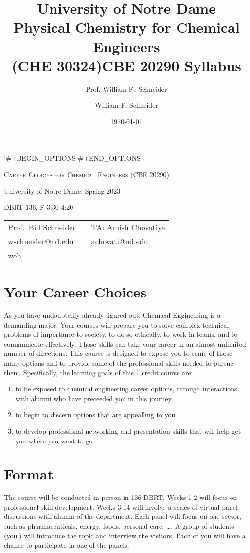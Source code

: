 \documentclass[11pt]{article}
\title{University of Notre Dame\\Physical Chemistry for Chemical Engineers\\(CHE 30324)}
\author{Prof. William F.\ Schneider}
\author{William F. Schneider}
\date{\today}
\title{CBE 20290  Syllabus}
\begin{document}
'\#+BEGIN\_OPTIONS
\#+END\_OPTIONS

\begin{center}
\textsc{Career Choices for Chemical Engineers (CBE 20290)}

University of Notre Dame, Spring 2023

DBRT 136, F 3:30-4:20 
\end{center}

\begin{center}
\begin{tabular}{lll}
\hline
Prof.~\href{https://www.linkedin.com/in/william-schneider-570091a/}{Bill Schneider} &  & TA: \href{https://www.linkedin.com/in/amish-chovatiya/}{Amish Chovatiya}\\
\href{mailto:wschneider@nd.edu}{wschneider@nd.edu} &  & \href{mailto:achovati@nd.edu}{achovati@nd.edu}\\
\href{https://www.nd.edu/\~wschnei1}{web} &  & \\
\hline
\end{tabular}
\end{center}

\section{Your Career Choices}
\label{sec:org9aaa727}
As you have undoubtedly already figured out, Chemical Engineering is a demanding major. Your courses will prepare you to solve complex technical problems of importance to society, to do so ethically, to work in teams, and to communicate effectively.  Those skills can take your career in an almost unlimited number of directions. This course is designed to expose you to some of those many options and to provide some of the professional skills needed to pursue them. Specifically, the learning goals of this 1 credit course are:

\begin{enumerate}
\item to be exposed to chemical engineering career options, through interactions with alumni who have preceeded you in this journey
\item to begin to discern options that are appealling to you
\item to develop  professional networking and presentation skills that will help get you where you want to go
\end{enumerate}

\section{Format}
\label{sec:org24e2393}
The course will be conducted in person in 136 DBRT.  Weeks 1-2 will focus on professional skill development. Weeks 3-14 will involve a series of virtual panel discussions with alumni of the department. Each panel will focus on one sector, such as pharmaceuticals, energy, foods, personal care, \ldots. A group of students (you!) will introduce the topic and interview the visitors. Each of you will have a chance to participate in one of the panels.
\newline
\end{document}
